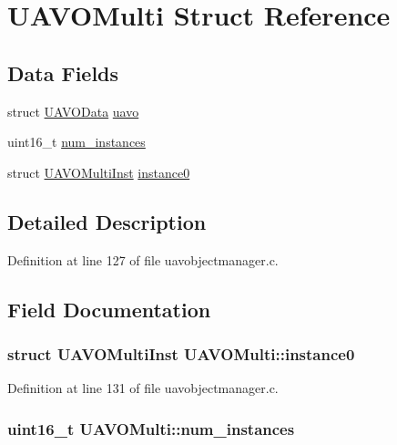 \hypertarget{struct_u_a_v_o_multi}{\section{\-U\-A\-V\-O\-Multi \-Struct \-Reference}
\label{struct_u_a_v_o_multi}
}
\subsection*{\-Data \-Fields}
\begin{DoxyCompactItemize}
\item 
struct \hyperlink{struct_u_a_v_o_data}{\-U\-A\-V\-O\-Data} \hyperlink{struct_u_a_v_o_multi_a718e24f6eadeb8508309dcb0eeeb9bda}{uavo}
\item 
uint16\-\_\-t \hyperlink{struct_u_a_v_o_multi_a9502c6a24b6d21d6ec4e48fbe166f1c4}{num\-\_\-instances}
\item 
struct \hyperlink{struct_u_a_v_o_multi_inst}{\-U\-A\-V\-O\-Multi\-Inst} \hyperlink{struct_u_a_v_o_multi_a2512d4c2267924e345079a69ae78b209}{instance0}
\end{DoxyCompactItemize}


\subsection{\-Detailed \-Description}


\-Definition at line 127 of file uavobjectmanager.\-c.



\subsection{\-Field \-Documentation}
\hypertarget{struct_u_a_v_o_multi_a2512d4c2267924e345079a69ae78b209}{
\subsubsection[{instance0}]{\setlength{\rightskip}{0pt plus 5cm}struct {\bf \-U\-A\-V\-O\-Multi\-Inst} {\bf \-U\-A\-V\-O\-Multi\-::instance0}}}\label{struct_u_a_v_o_multi_a2512d4c2267924e345079a69ae78b209}


\-Definition at line 131 of file uavobjectmanager.\-c.

\hypertarget{struct_u_a_v_o_multi_a9502c6a24b6d21d6ec4e48fbe166f1c4}{
\subsubsection[{num\-\_\-instances}]{\setlength{\rightskip}{0pt plus 5cm}uint16\-\_\-t {\bf \-U\-A\-V\-O\-Multi\-::num\-\_\-instances}}}\label{struct_u_a_v_o_multi_a9502c6a24b6d21d6ec4e48fbe166f1c4}


